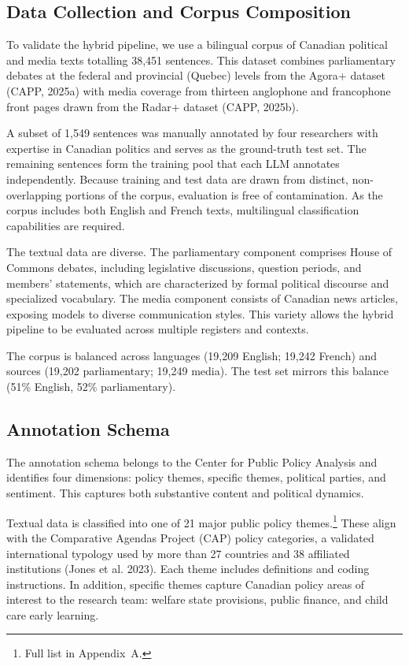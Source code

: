 \documentclass[12pt]{article}
\begin{document}
\subsection{Data Collection and Corpus Composition}

To validate the hybrid pipeline, we use a bilingual corpus of Canadian political and media texts totalling 38,451 sentences. This dataset combines parliamentary debates at the federal and provincial (Quebec) levels from the Agora+ dataset (CAPP, 2025a) with media coverage from thirteen anglophone and francophone front pages drawn from the Radar+ dataset (CAPP, 2025b).

A subset of 1,549 sentences was manually annotated by four researchers with expertise in Canadian politics and serves as the ground-truth test set. The remaining sentences form the training pool that each LLM annotates independently. Because training and test data are drawn from distinct, non-overlapping portions of the corpus, evaluation is free of contamination. As the corpus includes both English and French texts, multilingual classification capabilities are required.

The textual data are diverse. The parliamentary component comprises House of Commons debates, including legislative discussions, question periods, and members’ statements, which are characterized by formal political discourse and specialized vocabulary. The media component consists of Canadian news articles, exposing models to diverse communication styles. This variety allows the hybrid pipeline to be evaluated across multiple registers and contexts.



The corpus is balanced across languages (19,209 English; 19,242 French) and sources (19,202 parliamentary; 19,249 media). The test set mirrors this balance (51\% English, 52\% parliamentary).

\subsection{Annotation Schema}

The annotation schema belongs to the Center for Public Policy Analysis and identifies four dimensions: policy themes, specific themes, political parties, and sentiment. This captures both substantive content and political dynamics.

Textual data is classified into one of 21 major public policy themes.\footnote{Full list in Appendix~A.} These align with the Comparative Agendas Project (CAP) policy categories, a validated international typology used by more than 27 countries and 38 affiliated institutions (Jones et al. 2023). Each theme includes definitions and coding instructions. In addition, specific themes capture Canadian policy areas of interest to the research team: welfare state provisions, public finance, and child care early learning.
\end{document}
